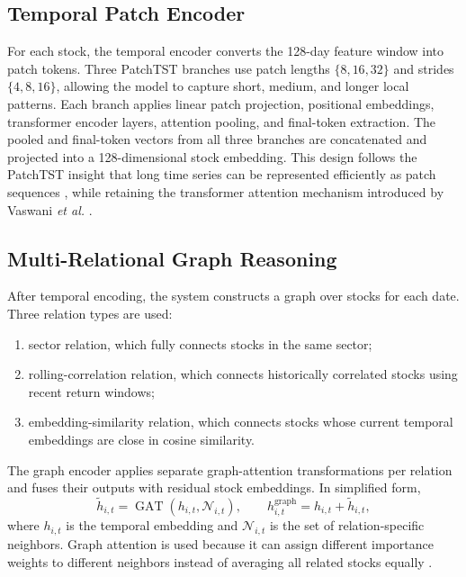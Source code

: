 \documentclass[conference]{IEEEtran}
\begin{document}
\subsection{Temporal Patch Encoder}
For each stock, the temporal encoder converts the 128-day feature window into patch tokens. Three PatchTST branches use patch lengths $\{8,16,32\}$ and strides $\{4,8,16\}$, allowing the model to capture short, medium, and longer local patterns. Each branch applies linear patch projection, positional embeddings, transformer encoder layers, attention pooling, and final-token extraction. The pooled and final-token vectors from all three branches are concatenated and projected into a 128-dimensional stock embedding. This design follows the PatchTST insight that long time series can be represented efficiently as patch sequences \cite{nie2023patchtst}, while retaining the transformer attention mechanism introduced by Vaswani \emph{et al.} \cite{vaswani2017attention}.

\subsection{Multi-Relational Graph Reasoning}
After temporal encoding, the system constructs a graph over stocks for each date. Three relation types are used:
\begin{enumerate}
    \item sector relation, which fully connects stocks in the same sector;
    \item rolling-correlation relation, which connects historically correlated stocks using recent return windows;
    \item embedding-similarity relation, which connects stocks whose current temporal embeddings are close in cosine similarity.
\end{enumerate}
The graph encoder applies separate graph-attention transformations per relation and fuses their outputs with residual stock embeddings. In simplified form,
\begin{equation}
\tilde{h}_{i,t}=\operatorname{GAT}(h_{i,t},\mathcal{N}_{i,t}), \qquad
h^{\text{graph}}_{i,t}=h_{i,t}+\tilde{h}_{i,t},
\end{equation}
where $h_{i,t}$ is the temporal embedding and $\mathcal{N}_{i,t}$ is the set of relation-specific neighbors. Graph attention is used because it can assign different importance weights to different neighbors instead of averaging all related stocks equally \cite{velickovic2018gat}.
\end{document}
